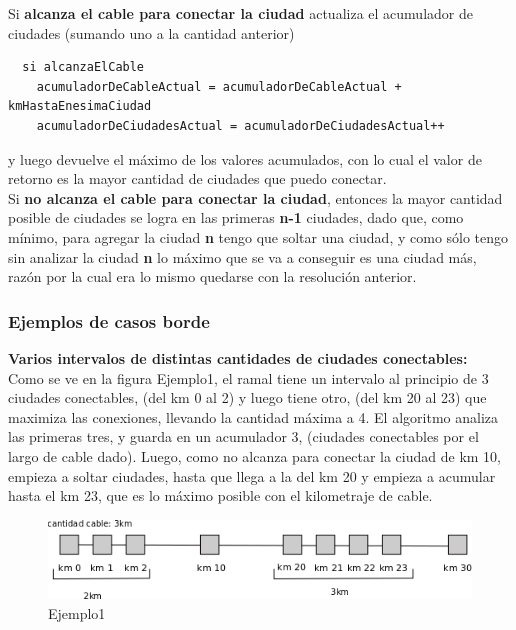 \documentclass[spanish,a4paper]{article}
\begin{document}
Si \textbf{alcanza el cable para conectar la ciudad} actualiza el acumulador de ciudades (sumando uno a la cantidad anterior)

\begin{lstlisting}
  si alcanzaElCable
    acumuladorDeCableActual = acumuladorDeCableActual + kmHastaEnesimaCiudad
    acumuladorDeCiudadesActual = acumuladorDeCiudadesActual++
\end{lstlisting}

y luego devuelve el máximo de los valores acumulados, con lo cual el valor de retorno es la mayor cantidad de ciudades que puedo conectar. \\

Si \textbf{no alcanza el cable para conectar la ciudad}, entonces la mayor cantidad posible de ciudades se logra en las primeras \textbf{n-1} ciudades, dado que, como mínimo, para agregar la ciudad \textbf{n} tengo que soltar una ciudad, y como sólo tengo sin analizar la ciudad \textbf{n} lo máximo que se va a conseguir es una ciudad más, razón por la cual era lo mismo quedarse con la resolución anterior.

\subsubsection{Ejemplos de casos borde}

\textbf{Varios intervalos de distintas cantidades de ciudades conectables:} \\

Como se ve en la figura Ejemplo1, el ramal tiene un intervalo al principio de 3 ciudades conectables, (del km 0 al 2) y luego tiene otro, (del km 20 al 23) que maximiza las conexiones, llevando la cantidad máxima a 4. El algoritmo analiza las primeras tres, y guarda en un acumulador 3, (ciudades conectables por el largo de cable dado). Luego, como no alcanza para conectar la ciudad de km 10, empieza a soltar ciudades, hasta que llega a la del km 20 y empieza a acumular hasta el km 23, que es lo máximo posible con el kilometraje de cable.

\begin{figure}[h]
\centering
\includegraphics[scale = 0.7]{caso1}
\caption{Ejemplo1}
\label{Ejemplo1}
\end{figure}
\end{document}

